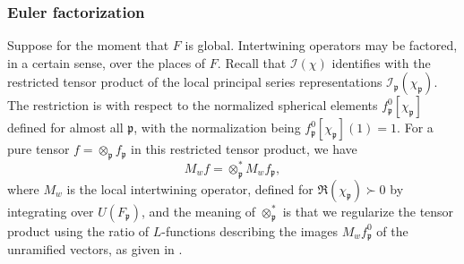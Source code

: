 \subsubsection{Euler factorization}\label{sec:fact-intertw-oper}
Suppose for the moment that $F$ is global.  Intertwining operators may be factored, in a certain sense, over the places of $F$.  Recall that $\mathcal{I}(\chi)$ identifies with the restricted tensor product of the local principal series representations $\mathcal{I}_\mathfrak{p}(\chi_\mathfrak{p})$.  The restriction is with respect to the normalized spherical elements $f_\mathfrak{p}^0[\chi_\mathfrak{p}]$ defined for almost all $\mathfrak{p}$, with the normalization being $f_\mathfrak{p}^0[\chi_\mathfrak{p}](1) = 1$.  For a pure tensor $f = \otimes_\mathfrak{p} f_\mathfrak{p}$ in this restricted tensor product, we have
\begin{equation*}
  M_w f = \otimes_\mathfrak{p} ^* M_w f_\mathfrak{p},
\end{equation*}
where $M_w$ is the local intertwining operator, defined  for $\Re(\chi_\mathfrak{p}) \succ 0$ by integrating over $U(F_\mathfrak{p})$, and the meaning of $\otimes_\mathfrak{p}^*$ is that we regularize the tensor product using the ratio of $L$-functions describing the images $M_w f_\mathfrak{p}^0$ of the unramified vectors, as given in \cite[(4)]{MR0419366}.

